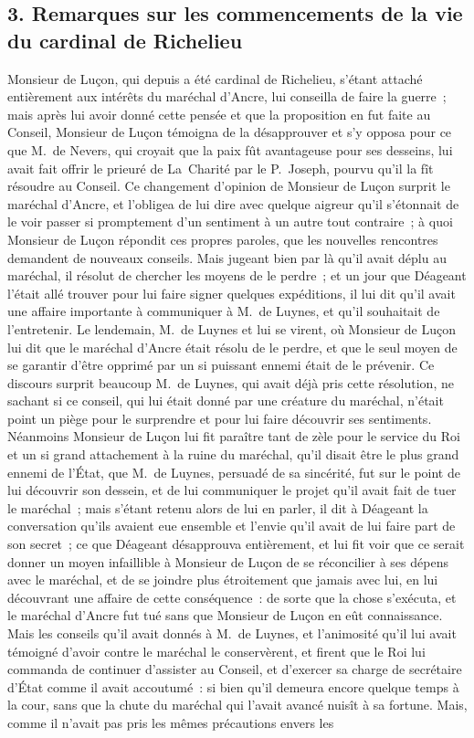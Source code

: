 \documentclass[french,twoside]{book} %
\begin{document}
\subsection[{3. Remarques sur les commencements de la vie du cardinal de Richelieu}]{3. Remarques sur les commencements de la vie du cardinal de Richelieu}
\noindent Monsieur de Luçon, qui depuis a été cardinal de Richelieu, s’étant attaché entièrement aux intérêts du maréchal d’Ancre, lui conseilla de faire la guerre ; mais après lui avoir donné cette pensée et que la proposition en fut faite au Conseil, Monsieur de Luçon témoigna de la désapprouver et s’y opposa pour ce que M. de Nevers, qui croyait que la paix fût avantageuse pour ses desseins, lui avait fait offrir le prieuré de La Charité par le P. Joseph, pourvu qu’il la fît résoudre au Conseil. Ce changement d’opinion de Monsieur de Luçon surprit le maréchal d’Ancre, et l’obligea de lui dire avec quelque aigreur qu’il s’étonnait de le voir passer si promptement d’un sentiment à un autre tout contraire ; à quoi Monsieur de Luçon répondit ces propres paroles, que les nouvelles rencontres demandent de nouveaux conseils. Mais jugeant bien par là qu’il avait déplu au maréchal, il résolut de chercher les moyens de le perdre ; et un jour que Déageant l’était allé trouver pour lui faire signer quelques expéditions, il lui dit qu’il avait une affaire importante à communiquer à M. de Luynes, et qu’il souhaitait de l’entretenir. Le lendemain, M. de Luynes et lui se virent, où Monsieur de Luçon lui dit que le maréchal d’Ancre était résolu de le perdre, et que le seul moyen de se garantir d’être opprimé par un si puissant ennemi était de le prévenir. Ce discours surprit beaucoup M. de Luynes, qui avait déjà pris cette résolution, ne sachant si ce conseil, qui lui était donné par une créature du maréchal, n’était point un piège pour le surprendre et pour lui faire découvrir ses sentiments. Néanmoins Monsieur de Luçon lui fit paraître tant de zèle pour le service du Roi et un si grand attachement à la ruine du maréchal, qu’il disait être le plus grand ennemi de l’État, que M. de Luynes, persuadé de sa sincérité, fut sur le point de lui découvrir son dessein, et de lui communiquer le projet qu’il avait fait de tuer le maréchal ; mais s’étant retenu alors de lui en parler, il dit à Déageant la conversation qu’ils avaient eue ensemble et l’envie qu’il avait de lui faire part de son secret ; ce que Déageant désapprouva entièrement, et lui fit voir que ce serait donner un moyen infaillible à Monsieur de Luçon de se réconcilier à ses dépens avec le maréchal, et de se joindre plus étroitement que jamais avec lui, en lui découvrant une affaire de cette conséquence : de sorte que la chose s’exécuta, et le maréchal d’Ancre fut tué sans que Monsieur de Luçon en eût connaissance. Mais les conseils qu’il avait donnés à M. de Luynes, et l’animosité qu’il lui avait témoigné d’avoir contre le maréchal le conservèrent, et firent que le Roi lui commanda de continuer d’assister au Conseil, et d’exercer sa charge de secrétaire d’État comme il avait accoutumé : si bien qu’il demeura encore quelque temps à la cour, sans que la chute du maréchal qui l’avait avancé nuisît à sa fortune. Mais, comme il n’avait pas pris les mêmes précautions envers les 
\end{document}
